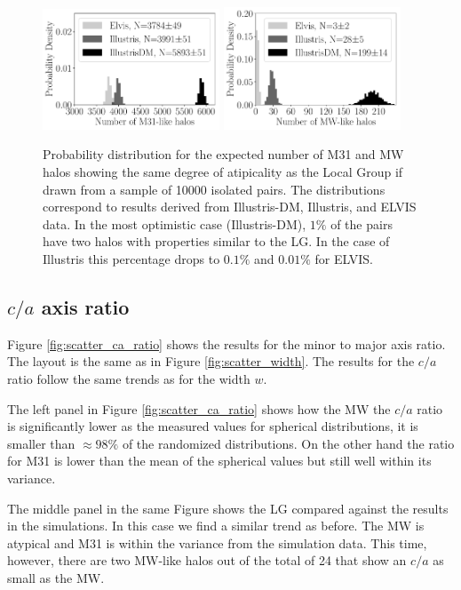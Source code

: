 \documentclass[a4paper,fleqn,usenatbib]{mnras}
\begin{document}
\begin{figure}
\centering
\includegraphics[width=0.47\textwidth]{expected_numbers_n_M31.pdf}
\includegraphics[width=0.47\textwidth]{expected_numbers_n_MW.pdf}
\caption{Probability distribution for the expected number of M31 and
  MW halos  showing the same degree of atipicality as the Local Group if drawn
  from a sample of 10000 isolated pairs. 
  The distributions correspond to results derived from Illustris-DM, Illustris,
  and ELVIS data.
  In the most optimistic case (Illustris-DM), $1\%$ of the pairs have
  two halos with properties similar to the LG. In the case of
  Illustris this percentage drops to $0.1\%$ and $0.01\%$ for ELVIS.
\label{fig:expected_number}}
\end{figure}

\subsection{$c/a$ axis ratio}

Figure \ref{fig:scatter_ca_ratio} shows the results for the minor to
major axis ratio. 
The layout is the same as in Figure \ref{fig:scatter_width}.
The results for the $c/a$ ratio follow the same trends as for the
width $w$.

The left panel in Figure \ref{fig:scatter_ca_ratio} shows how the MW
the $c/a$ ratio is significantly lower as the measured values for
spherical distributions, it is smaller than $\approx 98\%$ of the
randomized distributions.   
On the other hand the ratio for M31 is lower than the mean of the
spherical values but still well within its variance.

The middle panel in the same Figure shows the LG compared against the
results in the simulations. 
In this case we find a similar trend as before. 
The MW is atypical and M31 is within the variance from the simulation data.
This time, however, there are two MW-like halos out of the total
of 24 that show an $c/a$ as small as the MW.
\end{document}
